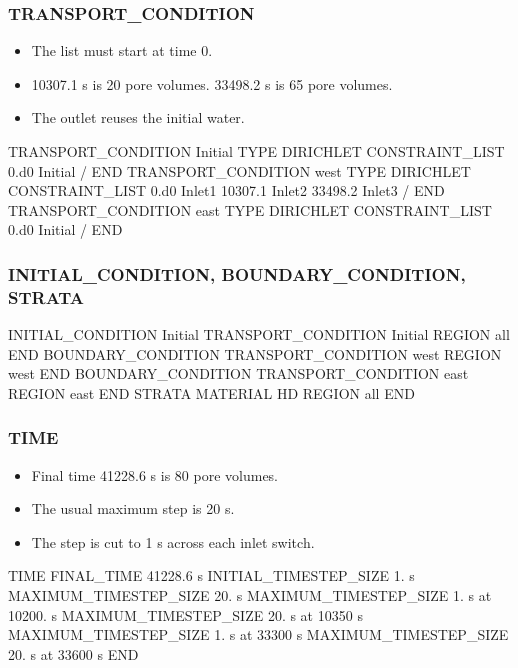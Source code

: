 \documentclass{beamer}
\begin{document}
\begin{frame}[fragile]\frametitle{TRANSPORT\_CONDITION}

\begin{itemize}
  \item The list must start at time 0.
  \item 10307.1 s is 20 pore volumes. 33498.2 s is 65 pore volumes.
  \item The outlet reuses the initial water.
\end{itemize}

\scriptsize
\begin{semiverbatim}
TRANSPORT_CONDITION Initial
  TYPE DIRICHLET
  CONSTRAINT_LIST
    0.d0 Initial
  /
END
TRANSPORT_CONDITION west
  TYPE DIRICHLET
  CONSTRAINT_LIST
    0.d0    Inlet1
    10307.1 Inlet2
    33498.2 Inlet3
  /
END
TRANSPORT_CONDITION east
  TYPE DIRICHLET
  CONSTRAINT_LIST
    0.d0 Initial
  /
END
\end{semiverbatim}

\end{frame}

\begin{frame}[fragile]\frametitle{INITIAL\_CONDITION, BOUNDARY\_CONDITION, STRATA}

\scriptsize
\begin{semiverbatim}
INITIAL_CONDITION Initial
  TRANSPORT_CONDITION Initial
  REGION all
END
BOUNDARY_CONDITION
  TRANSPORT_CONDITION west
  REGION west
END
BOUNDARY_CONDITION
  TRANSPORT_CONDITION east
  REGION east
END
STRATA
  MATERIAL HD
  REGION all
END
\end{semiverbatim}

\end{frame}

\begin{frame}[fragile]\frametitle{TIME}

\begin{itemize}
  \item Final time 41228.6 s is 80 pore volumes.
  \item The usual maximum step is 20 s.
  \item The step is cut to 1 s across each inlet switch.
\end{itemize}

\scriptsize
\begin{semiverbatim}
TIME
  FINAL_TIME 41228.6 s
  INITIAL_TIMESTEP_SIZE 1. s
  MAXIMUM_TIMESTEP_SIZE 20. s
  MAXIMUM_TIMESTEP_SIZE 1. s at 10200. s
  MAXIMUM_TIMESTEP_SIZE 20. s at 10350 s
  MAXIMUM_TIMESTEP_SIZE 1. s at 33300 s
  MAXIMUM_TIMESTEP_SIZE 20. s at 33600 s
END
\end{semiverbatim}

\end{frame}
\end{document}
